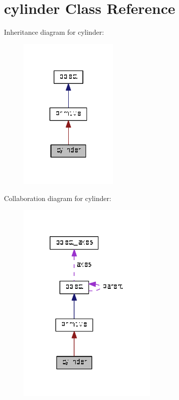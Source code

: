 \hypertarget{classcylinder}{}\section{cylinder Class Reference}
\label{classcylinder}


Inheritance diagram for cylinder\+:\nopagebreak
\begin{figure}[H]
\begin{center}
\leavevmode
\includegraphics[width=136pt]{classcylinder__inherit__graph}
\end{center}
\end{figure}


Collaboration diagram for cylinder\+:\nopagebreak
\begin{figure}[H]
\begin{center}
\leavevmode
\includegraphics[width=191pt]{classcylinder__coll__graph}
\end{center}
\end{figure}
